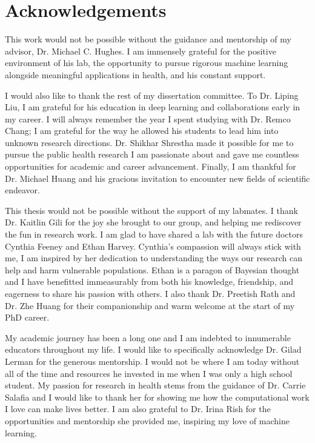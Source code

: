 \chapter*{Acknowledgements}

This work would not be possible without the guidance and mentorship of my advisor, Dr. Michael C. Hughes. I am immensely grateful for the positive environment of his lab, the opportunity to pursue rigorous machine learning alongside meaningful applications in health, and his constant support. 

I would also like to thank the rest of my dissertation committee. To Dr. Liping Liu, I am grateful for his education in deep learning and collaborations early in my career. I will always remember the year I spent studying with Dr. Remco Chang; I am grateful for the way he allowed his students to lead him into unknown research directions. Dr. Shikhar Shrestha made it possible for me to pursue the public health research I am passionate about and gave me countless opportunities for academic and career advancement. Finally, I am thankful for Dr. Michael Huang and his gracious invitation to encounter new fields of scientific endeavor. 

This thesis would not be possible without the support of my labmates. I thank Dr. Kaitlin Gili for the joy she brought to our group, and helping me rediscover the fun in research work. I am glad to have shared a lab with the future doctors Cynthia Feeney and Ethan Harvey. Cynthia's compassion will always stick with me, I am inspired by her dedication to understanding the ways our research can help and harm vulnerable populations. Ethan is a paragon of Bayesian thought and I have benefitted immeasurably from both his knowledge, friendship, and eagerness to share his passion with others. I also thank Dr. Preetish Rath and Dr. Zhe Huang for their companionship and warm welcome at the start of my PhD career.

My academic journey has been a long one and I am indebted to innumerable educators throughout my life. I would like to specifically acknowledge Dr. Gilad Lerman for the generous mentorship. I would not be where I am today without all of the time and resources he invested in me when I was only a high school student. My passion for research in health stems from the guidance of Dr. Carrie Salafia and I would like to thank her for showing me how the computational work I love can make lives better.  I am also grateful to Dr. Irina Rish for the opportunities and mentorship she provided me, inspiring my love of machine learning.

